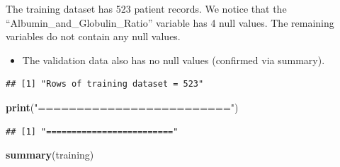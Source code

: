 \documentclass[]{article}
\newenvironment{Shaded}{\begin{snugshade}}{\end{snugshade}}
\newcommand{\KeywordTok}[1]{\textcolor[rgb]{0.13,0.29,0.53}{\textbf{#1}}}
\newcommand{\NormalTok}[1]{#1}
\newcommand{\StringTok}[1]{\textcolor[rgb]{0.31,0.60,0.02}{#1}}
\begin{document}
The training dataset has 523 patient records. We notice that the
``Albumin\_and\_Globulin\_Ratio'' variable has 4 null values. The
remaining variables do not contain any null values.

\begin{itemize}
\item The validation data also has no null values (confirmed via summary).
\end{itemize}

\begin{Shaded}
\end{Shaded}

\begin{verbatim}
## [1] "Rows of training dataset = 523"
\end{verbatim}

\begin{Shaded}
\begin{Highlighting}[]
\KeywordTok{print}\NormalTok{(}\StringTok{"========================="}\NormalTok{)}
\end{Highlighting}
\end{Shaded}

\begin{verbatim}
## [1] "========================="
\end{verbatim}

\begin{Shaded}
\begin{Highlighting}[]
\KeywordTok{summary}\NormalTok{(training)}
\end{Highlighting}
\end{Shaded}
\end{document}
